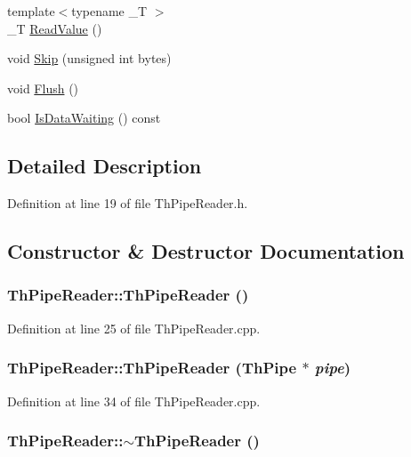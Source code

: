 \begin{CompactItemize}
\item 
{\footnotesize template$<$typename \_\-T $>$ }\\\_\-T \hyperlink{class_th_pipe_reader_dcd18ecfa379c59db0101002a46db107}{ReadValue} ()
\item 
void \hyperlink{class_th_pipe_reader_3ddf88fbd931b32aa11e8d80274686ea}{Skip} (unsigned int bytes)
\item 
void \hyperlink{class_th_pipe_reader_6bd170ad2cc37227e1cec282c7ea64a0}{Flush} ()
\item 
bool \hyperlink{class_th_pipe_reader_507edd4133881b06ac555f2991c0a665}{IsDataWaiting} () const 
\end{CompactItemize}


\subsection{Detailed Description}


Definition at line 19 of file ThPipeReader.h.

\subsection{Constructor \& Destructor Documentation}
\hypertarget{class_th_pipe_reader_66a72a215e2e5c9cd7baa25c62b869c2}{
\subsubsection[{ThPipeReader}]{\setlength{\rightskip}{0pt plus 5cm}ThPipeReader::ThPipeReader ()}}
\label{class_th_pipe_reader_66a72a215e2e5c9cd7baa25c62b869c2}




Definition at line 25 of file ThPipeReader.cpp.\hypertarget{class_th_pipe_reader_b3bc38f4d40642940d678769b0c53b79}{
\subsubsection[{ThPipeReader}]{\setlength{\rightskip}{0pt plus 5cm}ThPipeReader::ThPipeReader ({\bf ThPipe} $\ast$ {\em pipe})}}
\label{class_th_pipe_reader_b3bc38f4d40642940d678769b0c53b79}




Definition at line 34 of file ThPipeReader.cpp.\hypertarget{class_th_pipe_reader_a81fc061dec7eb3b48b216679288ddb8}{
\subsubsection[{$\sim$ThPipeReader}]{\setlength{\rightskip}{0pt plus 5cm}ThPipeReader::$\sim$ThPipeReader ()}}
\label{class_th_pipe_reader_a81fc061dec7eb3b48b216679288ddb8}





